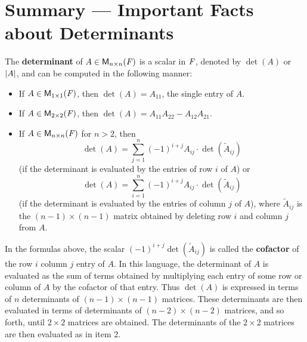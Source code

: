 \section{Summary --- Important Facts about Determinants}\label{sec:4.4}

\begin{note}
	The \textbf{determinant} of \(A \in \ms[n][n][\F]\) is a scalar in \(\mathit{F}\), denoted by \(\det(A)\) or \(\left\lvert A\right\rvert\), and can be computed in the following manner:
	\begin{itemize}
		\item If \(A \in \ms[1][1][\F]\), then \(\det(A) = A_{1 1}\), the single entry of \(A\).
		\item If \(A \in \ms[2][2][\F]\), then \(\det(A) = A_{1 1} A_{2 2} - A_{1 2} A_{2 1}\).
		\item If \(A \in \ms[n][n][\F]\) for \(n > 2\), then
		      \[
			      \det(A) = \sum_{j = 1}^n (-1)^{i + j} A_{i j} \cdot \det(\tilde{A}_{i j})
		      \]
		      (if the determinant is evaluated by the entries of row \(i\) of \(A\)) or
		      \[
			      \det(A) = \sum_{i = 1}^n (-1)^{i + j} A_{i j} \cdot \det(\tilde{A}_{i j})
		      \]
		      (if the determinant is evaluated by the entries of column \(j\) of \(A\)), where \(\tilde{A}_{i j}\) is the \((n - 1) \times (n - 1)\) matrix obtained by deleting row \(i\) and column \(j\) from \(A\).
	\end{itemize}
	In the formulas above, the scalar \((-1)^{i + j} \det(\tilde{A}_{i j})\) is called the \textbf{cofactor} of the row \(i\) column \(j\) entry of \(A\).
	In this language, the determinant of \(A\) is evaluated as the sum of terms obtained by multiplying each entry of some row or column of \(A\) by the cofactor of that entry.
	Thus \(\det(A)\) is expressed in terms of \(n\) determinants of \((n - 1) \times (n - 1)\) matrices.
	These determinants are then evaluated in terms of determinants of \((n - 2) \times (n - 2)\) matrices, and so forth, until \(2 \times 2\) matrices are obtained.
	The determinants of the \(2 \times 2\) matrices are then evaluated as in item 2.
\end{note}

